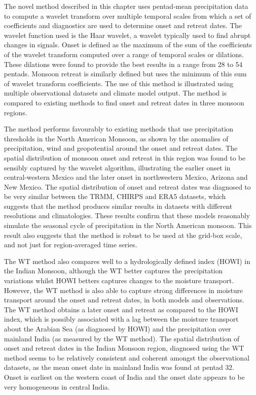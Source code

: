 The novel method described in this chapter uses pentad-mean precipitation data to compute a wavelet transform over multiple temporal scales from which a set of coefficients and diagnostics are used to determine onset and retreat dates. The wavelet function used is the Haar wavelet, a wavelet typically used to find abrupt changes in signals.
Onset is defined as the maximum of the sum of the coefficients of the wavelet transform computed over a range of temporal scales or dilations. These dilations were found to provide the best results in a range from 28 to 54 pentads. Monsoon retreat is similarly defined but uses the minimum of this sum of wavelet transform coefficients. The use of this method is illustrated using multiple observational datasets and climate model output. The method is compared to existing methods to find onset and retreat dates in three monsoon regions.

The method performs favourably to existing methods that use precipitation thresholds in the North American Monsoon, as shown by the anomalies of precipitation, wind and geopotential around the onset and retreat dates. 
The spatial distribution of monsoon onset and retreat in this region was found to be sensibly captured by the wavelet algorithm, illustrating the earlier onset in central-western Mexico and the later onset in northwestern Mexico, Arizona and New Mexico. 
The spatial distribution of onset and retreat dates was diagnosed to be very similar between the TRMM, CHIRPS and ERA5 datasets, which suggests that the method produces similar results in datasets with different resolutions and climatologies. These results confirm that these models reasonably simulate the seasonal cycle of precipitation in the North American monsoon. This result also suggests that the method is robust to be used at the grid-box scale, and not just for region-averaged time series.
 
The WT method also compares well to a hydrologically defined index (HOWI) in the Indian Monsoon, although the WT better captures the precipitation variations whilst HOWI betters captures changes to the moisture transport. However, the WT method is also able to capture strong differences in moisture transport around the onset and retreat dates, in both models and observations. The WT method obtains a later onset and retreat as compared to the HOWI index, which is possibly associated with a lag between the moisture transport about the Arabian Sea (as diagnosed by HOWI) and the precipitation over mainland India (as measured by the WT method). The spatial distribution of onset and retreat dates in the Indian Monsoon region, diagnosed using the WT method seems to be relatively consistent and coherent amongst the observational datasets, as the mean onset date in mainland India was found at pentad 32.
Onset is earliest on the western coast of India and the onset date appears to be very homogeneous in central India.

